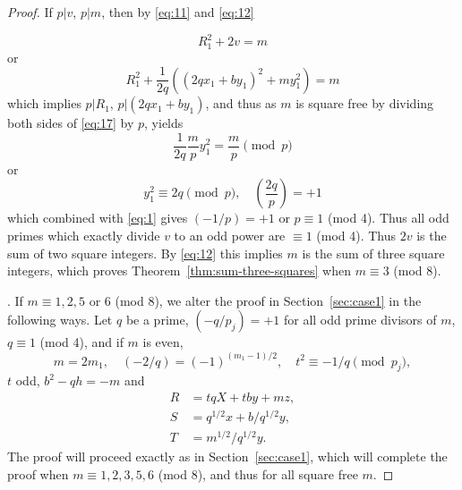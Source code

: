 \begin{proof}
If $p|v$, $p|m$, then by \eqref{eq:11} and \eqref{eq:12}

$$R_{1}^{2}+2v=m$$
or
\begin{equation}
R_{1}^{2}+\frac{1}{2q}((2qx_{1}+by_{1})^{2}+my_{1}^{2})=m \label{eq:17} \tag{17}
\end{equation}
which implies $p|R_{1}$, $p|(2qx_{1}+by_{1})$, and thus as $m$ is square free by dividing both sides of \eqref{eq:17} by $p$, yields
$$\frac{1}{2q}\frac{m}{p}y_{1}^{2}=\frac{m}{p} \pmod{p}$$
or
$$y_{1}^{2}\equiv2q \pmod{p}, \quad \left(\frac{2q}{p}\right)=+1$$
which combined with \eqref{eq:1} gives $(-1/p)=+1$ or $p\equiv1$ (mod 4).
Thus all odd primes which exactly divide $v$ to an odd power are $\equiv1$ (mod 4). Thus $2v$ is the sum of two square integers. By \eqref{eq:12} this implies $m$ is the sum of three square integers, which proves Theorem~\ref{thm:sum-three-squares} when $m\equiv3$ (mod 8).

\vspace{1em}

{}
\label{sec:case2}
. If $m \equiv 1, 2, 5$ or $6$ (mod 8), we alter the proof in Section~\ref{sec:case1} in the following ways.
Let $q$ be a prime, $(-q/p_{j})=+1$ for all odd prime divisors of $m$, $q\equiv1$ (mod 4), and if $m$ is even,
$$m=2m_{1}, \quad (-2/q)=(-1)^{(m_{1}-1)/2}, \quad t^{2}\equiv-1/q \pmod{p_{j}},$$
$t$ odd, $b^{2}-qh=-m$
and
\begin{align*}
R&=tqX+tby+mz, \\
S&=q^{1/2}x+b/q^{1/2}y, \\
T&=m^{1/2}/q^{1/2}y.
\end{align*}
The proof will proceed exactly as in Section~\ref{sec:case1}, which will complete the proof when $m\equiv1, 2, 3, 5, 6$ (mod 8), and thus for all square free $m$.
\end{proof}

